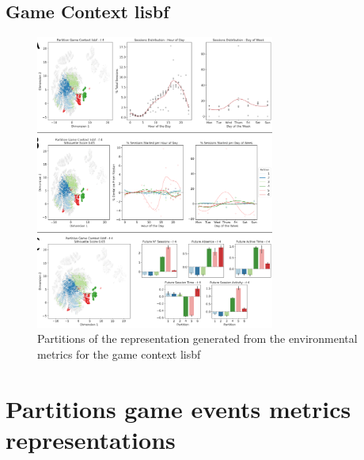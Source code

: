 \subsection{Game Context lisbf}
\label{env_clust_lisbf}

\begin{figure}[ht]
\includegraphics[width=0.7\textwidth]{images/appendix_D/clust_env_lisbf.png}
\centering
\caption[Partitions of the representation generated from the environmental metrics for the game context lisbf]{Partitions of the representation generated from the environmental metrics for the game context lisbf}
\end{figure}
\FloatBarrier

\section{Partitions game events metrics representations}
\label{partitions_game_events}